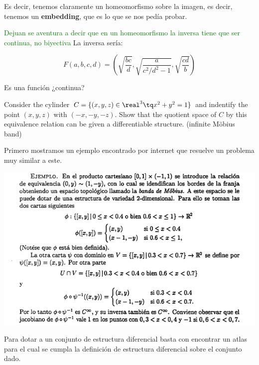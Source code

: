 \begin{problem}[5]
Es decir, tenemos claramente un homeomorfismo sobre la imagen, es decir, tenemos un \textbf{embedding}, que es lo que se nos pedía probar.

\textcolor{green}{Dejuan se aventura a decir que en un homeomorfismo la inversa tiene que ser continua, no biyectiva} La inversa sería:

\[
F(a,b,c,d) = \left(\sqrt{\frac{bc}{d}},\sqrt{\frac{a}{c^2/d^2 -1}},\sqrt{\frac{cd}{b}}\right)
\]

Es una función ¿continua?

\end{problem}

\begin{problem}[6]
Consider the cylinder $C=\{(x,y,z) \in \real^3 \tq x^2+y^2=1\}$ and indentify the point $(x,y,z)$ with $(-x,-y,-z)$. Show that the quotient space of $C$ by this equivalence relation can be given a differentiable structure. (infinite Möbius band)
\solution


Primero mostramos un ejemplo encontrado por internet que resuelve un problema muy similar a este.

\begin{center}
\includegraphics[keepaspectratio=true,width=\linewidth]{img/ejemplo_6.png}
\end{center}

Para dotar a un conjunto de estructura diferencial basta con encontrar un atlas para el cual se cumpla la definición de estructura diferencial sobre el conjunto dado.


\end{problem}
